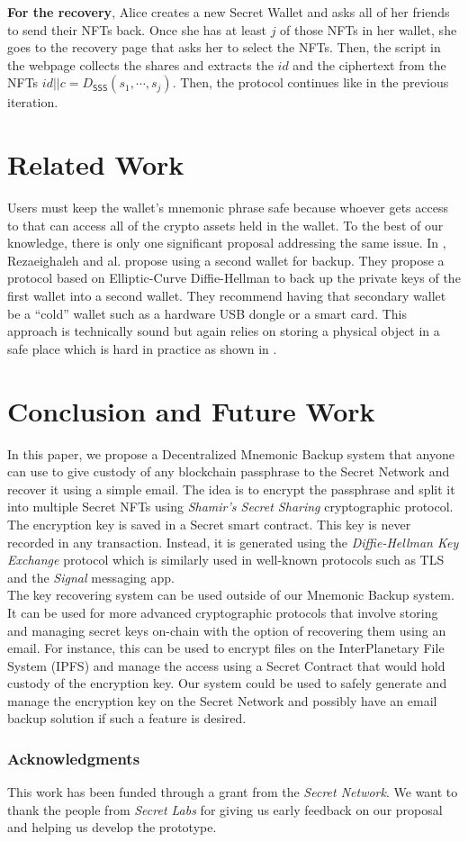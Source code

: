 \documentclass[runningheads]{llncs}
\newcommand{\ms}[1]{\ensuremath{\mathsf{#1}}}
\begin{document}
{\bf For the recovery}, Alice creates a new Secret Wallet and asks all of her friends to send their NFTs back. Once she has at least $j$ of those NFTs in her wallet, she goes to the recovery page that asks her to select the NFTs. Then, the script in the webpage collects the shares and extracts the $id$ and the ciphertext from the NFTs $id||c = D_{\ms{SSS}}(s_1,\cdots,s_j)$. Then, the protocol continues like in the previous iteration. 

\section{Related Work}

Users must keep the wallet's mnemonic phrase safe because whoever gets access to that can access all of the crypto assets held in the wallet. To the best of our knowledge, there is only one significant proposal addressing the same issue. In \cite{rezaeighaleh2019new}, Rezaeighaleh and al. propose using a second wallet for backup. They propose a protocol based on Elliptic-Curve Diffie-Hellman to back up the private keys of the first wallet into a second wallet. They recommend having that secondary wallet be a ``cold'' wallet such as a hardware USB dongle or a smart card. This approach is technically sound but again relies on storing a physical object in a safe place which is hard in practice as shown in \cite{voskobojnikov2021u}. 

\section{Conclusion and Future Work}

In this paper, we propose a Decentralized Mnemonic Backup system that anyone can use to give custody of any blockchain passphrase to the Secret Network and recover it using a simple email. The idea is to encrypt the passphrase and split it into multiple Secret NFTs using {\em Shamir's Secret Sharing} cryptographic protocol. The encryption key is saved in a Secret smart contract. This key is never recorded in any transaction. Instead, it is generated using the {\em Diffie-Hellman Key Exchange} protocol which is similarly used in well-known protocols such as TLS and the {\em Signal} messaging app. \\

The key recovering system can be used outside of our Mnemonic Backup system. It can be used for more advanced cryptographic protocols that involve storing and managing secret keys on-chain with the option of recovering them using an email. For instance, this can be used to encrypt files on the InterPlanetary File System
(IPFS) \cite{muralidharan2019interplanetary} and manage the access using a Secret Contract that would hold custody of the encryption key. Our system could be used to safely generate and manage the encryption key on the Secret Network and possibly have an email backup solution if such a feature is desired.  

\subsubsection{Acknowledgments} This work has been funded through a grant from the {\em Secret Network}. We want to thank the people from {\em Secret Labs} for giving us early feedback on our proposal and helping us develop the prototype. 



\end{document}
